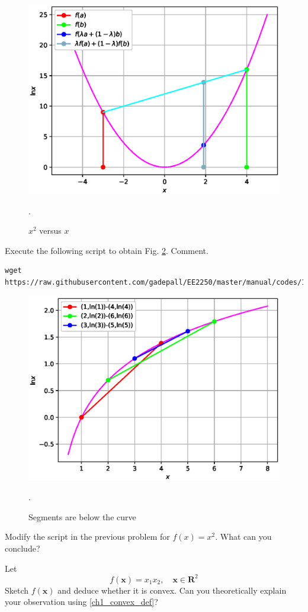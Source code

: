 \documentclass[journal,12pt,twocolumn]{IEEEtran}
\begin{document}
\begin{figure}[h]
\centering
\includegraphics[width=\columnwidth]{./figs/1.2.eps}
\caption{ $x^2$ versus $x$}.
\label{fig.1.2}	
\end{figure}
%
\begin{problem}
Execute the following script to obtain Fig. \ref{fig.1.3}. Comment.
\end{problem}
%
\begin{lstlisting}
wget https://raw.githubusercontent.com/gadepall/EE2250/master/manual/codes/1.3.py
\end{lstlisting}

%
\begin{figure}[h]
\centering
\includegraphics[width=\columnwidth]{./figs/1.3.eps}
\caption{ Segments are below the curve}.
\label{fig.1.3}	
\end{figure}
%
\begin{problem}
Modify the script in the previous problem for $f(x) = x^2$.  What can you conclude?
\end{problem}
\begin{problem}
Let 
\begin{equation}
f(\mathbf{x}) = x_1x_2, \quad \mathbf{x} \in \mathbf{R}^2
\end{equation}
Sketch $f(\mathbf{x})$ and deduce whether it is convex.
Can you theoretically explain your observation using \eqref{ch1_convex_def}?
\end{problem}
%
\end{document}
